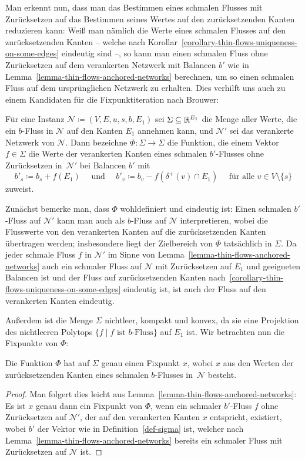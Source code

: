 Man erkennt nun, dass man das Bestimmen eines schmalen Flusses mit Zurücksetzen auf das Bestimmen seines Wertes auf den zurücksetzenden Kanten reduzieren kann:
Weiß man nämlich die Werte eines schmalen Flusses auf den zurücksetzenden Kanten -- welche nach Korollar~\ref{corollary-thin-flows-uniqueness-on-some-edges} eindeutig sind --, so kann man einen schmalen Fluss ohne Zurücksetzen auf dem verankerten Netzwerk mit Balancen $b'$ wie in Lemma~\ref{lemma-thin-flows-anchored-networks} berechnen, um so einen schmalen Fluss auf dem ursprünglichen Netzwerk zu erhalten.
Dies verhilft uns auch zu einem Kandidaten für die Fixpunktiteration nach Brouwer:

\begin{definition}\label{def-sigma}
	Für eine \problemThinFlow Instanz $\mathcal{N}\coloneq (V, E, u, s, b, E_1)$ sei $\Sigma\subseteq \mathbb{R}^{E_1}$ die Menge aller Werte, die ein $b$-Fluss in $\mathcal{N}$ auf den Kanten $E_1$ annehmen kann, und $\mathcal{N}'$ sei das verankerte Netzwerk von $\mathcal{N}$.
	Dann bezeichne $\Phi: \Sigma \rightarrow \Sigma$ die Funktion, die einem Vektor $f\in\Sigma$ die Werte der verankerten Kanten eines schmalen $b'$-Flusses ohne Zurücksetzen in~$\mathcal{N}'$ bei Balancen $b'$ mit
	\[
	b'_s \coloneq b_s + f(E_1) \text{~~~ und ~~~} b'_v \coloneq b_v - f( \delta^+(v)\cap E_1) \text{~~~ für alle $v\in V\setminus \{ s \}$}
	\]
	zuweist.
\end{definition}

Zunächst bemerke man, dass $\Phi$ wohldefiniert und eindeutig ist:
Einen schmalen $b'$-Fluss auf $\mathcal{N}'$ kann man auch als $b$-Fluss auf $\mathcal{N}$ interpretieren, wobei die Flusswerte von den verankerten Kanten auf die zurücksetzenden Kanten übertragen werden; insbesondere liegt der Zielbereich von $\Phi$ tatsächlich in $\Sigma$.
Da jeder schmale Fluss $f$ in $\mathcal{N}'$ im Sinne von Lemma~\ref{lemma-thin-flows-anchored-networks} auch ein schmaler Fluss auf $\mathcal{N}$ mit Zurücksetzen auf $E_1$ und geeigneten Balancen ist und der Fluss auf zurücksetzenden Kanten nach~\ref{corollary-thin-flows-uniqueness-on-some-edges} eindeutig ist, ist auch der Fluss auf den verankerten Kanten eindeutig.

Außerdem ist die Menge $\Sigma$ nichtleer, kompakt und konvex, da sie eine Projektion des nichtleeren Polytops $\{ f \mid \text{$f$ ist $b$-Fluss} \}$ auf $E_1$ ist.
Wir betrachten nun die Fixpunkte von $\Phi$:
\begin{proposition}
	Die Funktion $\Phi$ hat auf $\Sigma$ genau einen Fixpunkt $x$, wobei $x$ aus den Werten der zurücksetzenden Kanten eines schmalen $b$-Flusses in~$\mathcal{N}$ besteht.
\end{proposition}
\begin{proof}
	Man folgert dies leicht aus Lemma~\ref{lemma-thin-flows-anchored-networks}:
	Es ist $x$ genau dann ein Fixpunkt von $\Phi$, wenn ein schmaler $b'$-Fluss $f$ ohne Zurücksetzen auf $\mathcal{N}'$, der auf den verankerten Kanten $x$ entspricht, existiert, wobei $b'$ der Vektor wie in Definition~\ref{def-sigma} ist, welcher nach Lemma~\ref{lemma-thin-flows-anchored-networks} bereits ein schmaler Fluss mit Zurücksetzen auf $\mathcal{N}$ ist.	
\end{proof}

